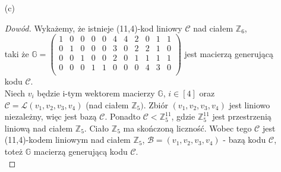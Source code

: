 \documentclass[10pt]{article} %
\begin{document}
\begin{enumerate}
\item[(c)] \begin{proof}[Dowód] 
Wykażemy, że istnieje (11,4)-kod liniowy $\mathcal{C}$ nad ciałem $\mathbb{Z}_6$, \vspace{10pt}
\\taki że $\mathbb{G} = \begin{pmatrix} 1&0&0&0&0&4&4&2&0&1&1\\
0&1&0&0&0&3&0&2&2&1&0\\
0&0&1&0&0&2&0&1&1&1&1\\
0&0&0&1&1&0&0&0&4&3&0\\
\end{pmatrix}$ jest macierzą generującą kodu $\mathcal{C}$.\vspace{10pt} \\
Niech $v_i$ będzie i-tym wektorem macierzy $\mathbb{G}$, $i \in [4]$ oraz $\mathcal{C} = \mathcal{L}(v_1, v_2, v_3, v_4)$ (nad ciałem $\mathbb{Z}_5)$. Zbiór $(v_1, v_2, v_3, v_4)$ jest liniowo niezależny, więc jest bazą $\mathcal{C}$. Ponadto $\mathcal{C} < \mathbb{Z}_5^{11}$, gdzie $\mathbb{Z}_5^{11}$ jest przestrzenią liniową nad ciałem $\mathbb{Z}_5$. Ciało $\mathbb{Z}_5$ ma skończoną liczność. Wobec tego $\mathcal{C}$ jest (11,4)-kodem liniowym nad ciałem $\mathbb{Z}_5$, $\mathcal{B}=(v_1, v_2, v_3, v_4)$ - bazą kodu $\mathcal{C}$, toteż $\mathbb{G}$ macierzą generującą kodu $\mathcal{C}$.\\

\end{proof}


\end{enumerate}
\end{document}
